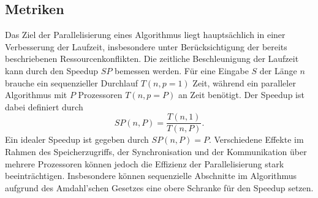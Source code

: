 \subsection{Metriken}
Das Ziel der Parallelisierung eines Algorithmus liegt hauptsächlich in einer Verbesserung der Laufzeit, insbesondere unter Berücksichtigung der bereits beschriebenen Ressourcenkonflikten. 
Die zeitliche Beschleunigung der Laufzeit kann durch den Speedup $SP$ bemessen werden. Für eine Eingabe $S$ der Länge $n$ brauche ein sequenzieller Durchlauf $T(n, p=1)$ Zeit, während ein 
paralleler Algorithmus mit $P$ Prozessoren $T(n,p=P)$ an Zeit benötigt. Der Speedup ist dabei definiert durch
\begin{equation}
    SP(n,P) = \frac{T(n,1)}{T(n,P)}.
\end{equation}
Ein idealer Speedup ist gegeben durch $SP(n,P)=P$. Verschiedene Effekte im Rahmen des Speicherzugriffs, der Synchronisation und der Kommunikation über mehrere Prozessoren können jedoch
die Effizienz der Parallelisierung stark beeinträchtigen. Insbesondere können sequenzielle Abschnitte im Algorithmus aufgrund des Amdahl'schen Gesetzes\cite{amdahl} eine obere Schranke 
für den Speedup setzen.

